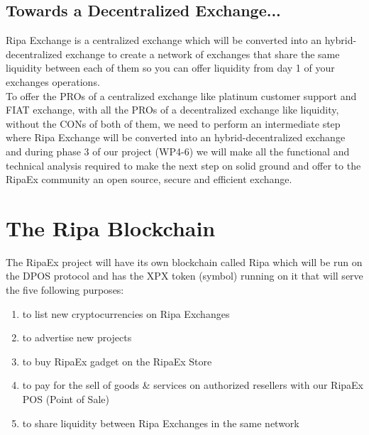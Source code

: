\documentclass[11pt,fleqn]{book} %
\begin{document}
\section{Towards a Decentralized Exchange...}
Ripa Exchange is a centralized exchange which will be converted into an hybrid-decentralized exchange to create a network of exchanges
that share the same liquidity between each of them so you can offer liquidity from day 1 of your exchanges operations.\\

To offer the PROs of a centralized exchange like platinum customer support and FIAT exchange, with all the PROs of a 
decentralized exchange like liquidity, without the CONs of both of them, 
we need to perform an intermediate step where Ripa Exchange will be converted into an hybrid-decentralized exchange 
and during phase 3 of our project (WP4-6) we will make all the functional and technical analysis required 
to make the next step on solid ground and offer to the RipaEx community an open source, secure and efficient exchange.



\chapter{The Ripa Blockchain}
\label{sec:theRipaBlockchain}
The RipaEx project will have its own blockchain called Ripa which will be run on the DPOS protocol and has the XPX 
token (\PHP symbol) running on it that will serve the five following purposes:
	\begin{enumerate}
		\item to list new cryptocurrencies on Ripa Exchanges
		\item to advertise new projects
		\item to buy RipaEx gadget on the RipaEx Store
		\item to pay for the sell of goods \& services on authorized resellers with our RipaEx POS (Point of Sale)
		\item to share liquidity between Ripa Exchanges in the same network
	\end{enumerate}
\end{document}
